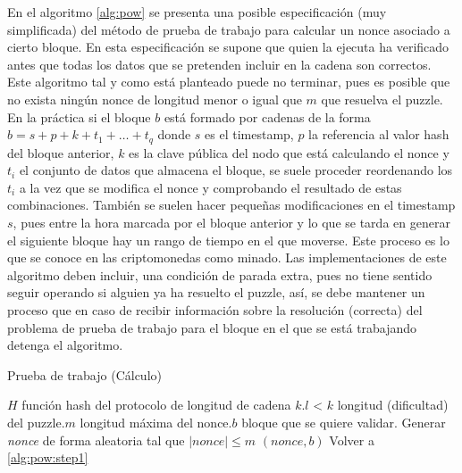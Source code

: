 En el algoritmo \ref{alg:pow} se presenta una posible especificación (muy simplificada) del método de prueba de trabajo para calcular un nonce  asociado a cierto bloque. En esta especificación se supone que quien la ejecuta ha verificado antes que todas los datos que se pretenden incluir en la cadena son correctos. Este algoritmo tal y como está planteado puede no terminar, pues es posible que no exista ningún nonce de longitud menor o igual que $m$ que resuelva el puzzle. En la práctica si el bloque $b$ está formado por cadenas de la forma $b = s+p+k+t_{1}+ \ldots + t_{q}$ donde $s$ es el timestamp, $p$ la referencia al valor hash del bloque anterior, $k$ es la clave pública del nodo que está calculando el nonce y $t_{i}$ el conjunto de datos que almacena el bloque, se suele proceder reordenando los $t_{i}$ a la vez que se modifica el nonce y comprobando el resultado de estas combinaciones. También se suelen hacer pequeñas modificaciones en el timestamp $s$, pues entre la hora marcada por el bloque anterior y lo que se tarda en generar el siguiente bloque hay un rango de tiempo en el que moverse. Este proceso es lo que se conoce en las criptomonedas como minado. Las implementaciones de este algoritmo deben incluir, una condición de parada extra, pues no tiene sentido seguir operando si alguien ya ha resuelto el puzzle, así, se debe mantener un proceso que en caso de recibir información sobre la resolución (correcta) del problema de prueba de trabajo para el bloque en el que se está trabajando detenga el algoritmo. 

\begin{algorithm}
\caption{Prueba de trabajo (Cálculo)}\label{alg:pow}
\begin{algorithmic}[1]
\Require \Statex $H$ función hash del protocolo de longitud de cadena $k$.\Statex $l$ < $k$ longitud (dificultad) del puzzle.\Statex $m$ longitud máxima del nonce.\Statex $b$ bloque que se quiere validar.
\State Generar \textit{nonce} de forma aleatoria tal que $|nonce| \leq m$ \label{alg:pow:step1}
 \Return $(nonce, b)$
\Else  Volver a  \ref{alg:pow:step1}
\EndIf
\end{algorithmic}
\end{algorithm}

